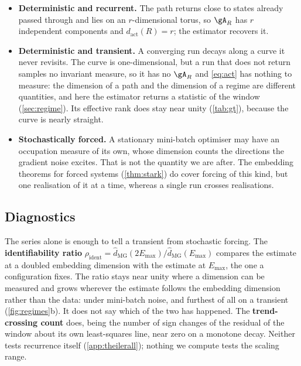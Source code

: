 \documentclass{article}
\begin{document}
\begin{itemize}[leftmargin=1.2em, itemsep=2pt, topsep=3pt, parsep=0pt]
\item \textbf{Deterministic and recurrent.} The path returns close to states already passed through
and lies on an $r$-dimensional torus, so $\gA_R$ has $r$ independent components and
$d_{\mathrm{act}}(R) = r$; the estimator recovers it.

\item \textbf{Deterministic and transient.} A converging run decays along a curve it never
revisits. The curve is one-dimensional, but a run that does not return samples no invariant
measure, so it has no $\gA_R$ and \cref{eq:act} has nothing to measure: the dimension of a path and
the dimension of a regime are different quantities, and here the estimator returns a statistic of
the window (\cref{sec:regime}). Its effective rank does stay near unity (\cref{tab:gt}), because
the curve is nearly straight.

\item \textbf{Stochastically forced.} A stationary mini-batch optimiser may have an occupation
measure of its own, whose dimension counts the directions the gradient noise excites. That is not
the quantity we are after. The embedding theorems for forced systems (\cref{thm:stark})
do cover forcing of this kind, but one realisation of it at a time, whereas a single run crosses
realisations.
\end{itemize}

\subsection{Diagnostics}\label{sec:diagnostics}

The series alone is enough to tell a transient from stochastic forcing. The \textbf{identifiability
ratio} $\rho_{\mathrm{ident}} = \hat{d}_{\mathrm{MG}}(2E_{\max}) / \hat{d}_{\mathrm{MG}}(E_{\max})$
compares the estimate at a doubled embedding dimension with the estimate at $E_{\max}$, the one a
configuration fixes. The ratio stays near unity where a
dimension can be measured and grows wherever the estimate follows the embedding dimension rather
than the data: under mini-batch noise, and furthest of all on a transient (\cref{fig:regimes}b).
It does not say which of the two has happened. The \textbf{trend-crossing count} does, being the
number of sign changes of the residual of the window about its own least-squares line, near zero on
a monotone decay. Neither tests recurrence itself (\cref{app:theilerall}); nothing we compute
tests the scaling range.
\end{document}
